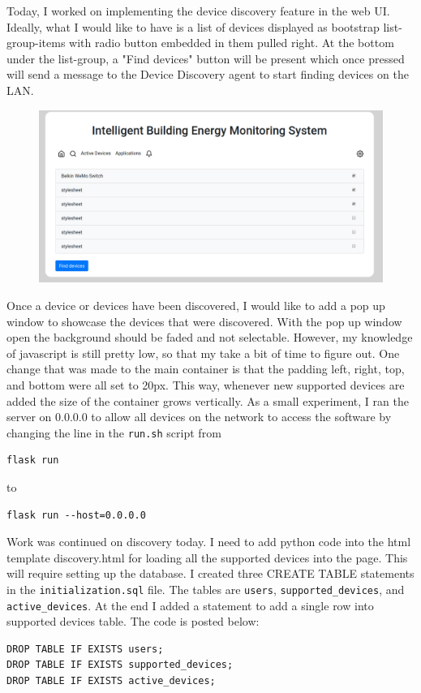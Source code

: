 \documentclass[fontsize=11pt, %
                             paper=letter, %
                             twoside, %
                             captions=tableheading,
                             index=totoc,
                             hyperref]{labbook}
\begin{document}
\begin{addmargin}[0cm]{0cm}
Today, I worked on implementing the device discovery feature in the web UI. Ideally, what I would like to have is a list of devices displayed as bootstrap list-group-items with radio button embedded in them pulled right. At the bottom under the list-group, a "Find devices" button will be present which once pressed will send a message to the Device Discovery agent to start finding devices on the LAN.
\begin{figure}[H]
\centering
\includegraphics[scale=0.35]{figs/img/deviceDiscoveryList}
\end{figure}
Once a device or devices have been discovered, I would like to add a pop up window to showcase the devices that were discovered. With the pop up window open the background should be faded and not selectable. However, my knowledge of javascript is still pretty low, so that my take a bit of time to figure out. One change that was made to the main container is that the padding left, right, top, and bottom were all set to 20px. This way, whenever new supported devices are added the size of the container grows vertically.
\smallbreak\noindent
As a small experiment, I ran the server on 0.0.0.0 to allow all devices on the network to access the software by changing the line in the \texttt{run.sh} script from 
\begin{verbatim}
flask run
\end{verbatim}
to
\begin{verbatim}
flask run --host=0.0.0.0
\end{verbatim}

Work was continued on discovery today. I need to add python code into the html template discovery.html for loading all the supported devices into the page. This will require setting up the database. I created three CREATE TABLE statements in the \texttt{initialization.sql} file. The tables are \texttt{users}, \texttt{supported\_devices}, and \texttt{active\_devices}. 
At the end I added a statement to add a single row into supported devices table. The code is posted below:
\begin{Verbatim}
DROP TABLE IF EXISTS users;
DROP TABLE IF EXISTS supported_devices;
DROP TABLE IF EXISTS active_devices;


\end{Verbatim}
\end{addmargin}
\end{document}
